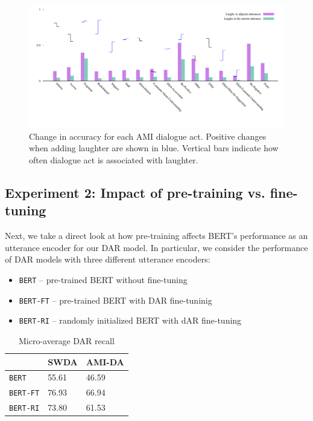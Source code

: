 \documentclass[11pt,a4paper]{article}
\begin{document}
\begin{figure}
  \centering
  \includegraphics[width=\textwidth]{img/AMI-DA-bertLvsNL.pdf}
  \caption{Change in accuracy for each AMI dialogue act. Positive changes when adding laughter are shown in blue. Vertical bars indicate how often dialogue act is associated with laughter.}
    \label{fig:ami-by-da}
  \end{figure}

  

%

\subsection{Experiment 2: Impact of pre-training vs. fine-tuning} \label{sec:experiment2} %
Next, we take a direct look at how pre-training affects BERT's performance as an utterance encoder for our DAR model.
In particular, we consider the performance of DAR models with three different utterance encoders:
\begin{itemize}
  \item \texttt{BERT} -- pre-trained BERT without fine-tuning 
  \item \texttt{BERT-FT} -- pre-trained BERT with DAR fine-tuninig 
  \item \texttt{BERT-RI} -- randomly initialized BERT with dAR fine-tuning 
\end{itemize}

\begin{table}[]
\centering 
\begin{tabular}{@{}lll@{}}
\toprule
                 & SWDA  & AMI-DA \\ \midrule
\texttt{BERT}       & 55.61 & 46.59  \\
\texttt{BERT-FT}    & 76.93 & 66.94  \\
\texttt{BERT-RI}    & 73.80 & 61.53  
\end{tabular}
  \caption{Micro-average DAR recall}
  \label{table:exp2-avg}
\end{table}    
\end{document}
